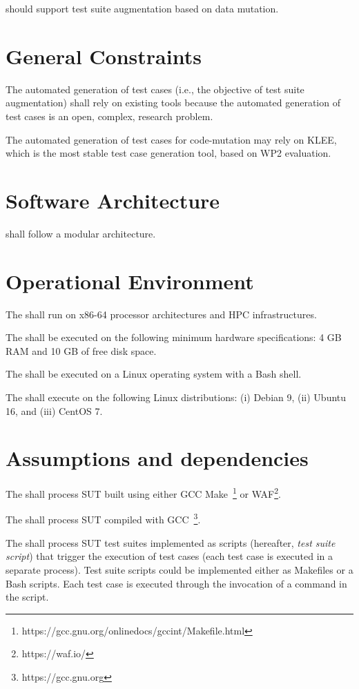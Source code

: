 \RQ{} \FAQAS should support test suite augmentation based on data mutation.


\section{General Constraints}

\RQ{} The automated generation of test cases (i.e., the objective of test suite augmentation) shall rely on existing tools because the automated generation of test cases is an open, complex, research problem.  

\RQ{} The automated generation of test cases for code-mutation may rely on KLEE, which is the most stable test case generation tool, based on WP2 evaluation.


\section{Software Architecture}

\RQ{} \FAQAS shall follow a modular architecture.

\section{Operational Environment}

\RQ{} The \FAQAS shall run on x86-64 processor architectures and HPC infrastructures.

\RQ{} The \FAQAS shall be executed on the following minimum hardware specifications: 4 GB RAM and 10 GB of free disk space.

\RQ{} The \FAQAS shall be executed on a Linux operating system with a Bash shell.

\RQ{} The \FAQAS shall execute on the following Linux distributions: (i) Debian 9, (ii) Ubuntu 16, and (iii) CentOS 7.

\section{Assumptions and dependencies}

\RQ{} The \FAQAS shall process SUT built using either GCC Make~\footnote{https://gcc.gnu.org/onlinedocs/gccint/Makefile.html} or WAF\footnote{https://waf.io/}.

\RQ{} The \FAQAS shall process SUT compiled with GCC~\footnote{https://gcc.gnu.org}.


\RQ{} The \FAQAS shall process SUT test suites implemented as scripts (hereafter, \emph{test suite script}) that trigger the execution of test cases (each test case is executed in a separate process). Test suite scripts could be implemented either as Makefiles or a Bash scripts. Each test case is executed through the invocation of a command in the script.



